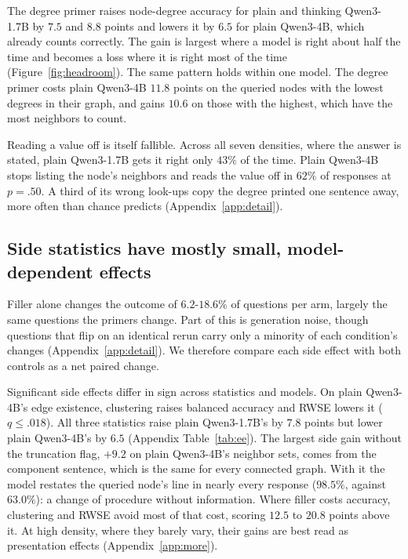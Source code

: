 \documentclass[11pt]{article}
\begin{document}
The degree primer raises node-degree accuracy for plain and thinking Qwen3-1.7B by $7.5$ and $8.8$ points and lowers it by $6.5$ for plain Qwen3-4B, which already counts correctly. %
The gain is largest where a model is right about half the time and becomes a loss where it is right most of the time (Figure~\ref{fig:headroom}). %
The same pattern holds within one model. The degree primer costs plain Qwen3-4B $11.8$ points on the queried nodes with the lowest degrees in their graph, and gains $10.6$ on those with the highest, which have the most neighbors to count. %

Reading a value off is itself fallible. Across all seven densities, where the answer is stated, plain Qwen3-1.7B gets it right only $43\%$ of the time. Plain Qwen3-4B stops listing the node's neighbors and reads the value off in $62\%$ of responses at $p=.50$. A third of its wrong look-ups copy the degree printed one sentence away, more often than chance predicts (Appendix~\ref{app:detail}). %

\subsection{Side statistics have mostly small, model-dependent effects}
\label{sec:side}
Filler alone changes the outcome of $6.2$-$18.6\%$ of questions per arm, largely the same questions the primers change. Part of this is generation noise, though questions that flip on an identical rerun carry only a minority of each condition's changes (Appendix~\ref{app:detail}). We therefore compare each side effect with both controls as a net paired change. %

Significant side effects differ in sign across statistics and models. On plain Qwen3-4B's edge existence, clustering raises balanced accuracy and RWSE lowers it ($q\leq.018$). All three statistics raise plain Qwen3-1.7B's by $7.8$ points but lower plain Qwen3-4B's by $6.5$ (Appendix Table~\ref{tab:ee}). %
The largest side gain without the truncation flag, $+9.2$ on plain Qwen3-4B's neighbor sets, comes from the component sentence, which is the same for every connected graph. With it the model restates the queried node's line in nearly every response ($98.5\%$, against $63.0\%$): a change of procedure without information. %
Where filler costs accuracy, clustering and RWSE avoid most of that cost, scoring $12.5$ to $20.8$ points above it. At high density, where they barely vary, their gains are best read as presentation effects (Appendix~\ref{app:more}). %
\end{document}

